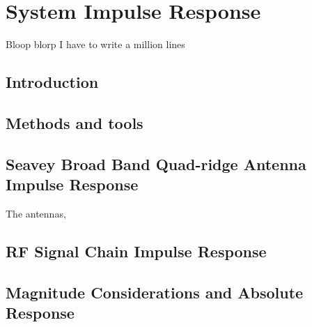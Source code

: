 %
%
%
%



\chapter{System Impulse Response}

Bloop blorp I have to write a million lines

\section{Introduction}

\section{Methods and tools}

\section{Seavey Broad Band Quad-ridge Antenna Impulse Response}

	The antennas, 

\section{RF Signal Chain Impulse Response}


\section{Magnitude Considerations and Absolute Response}
	
